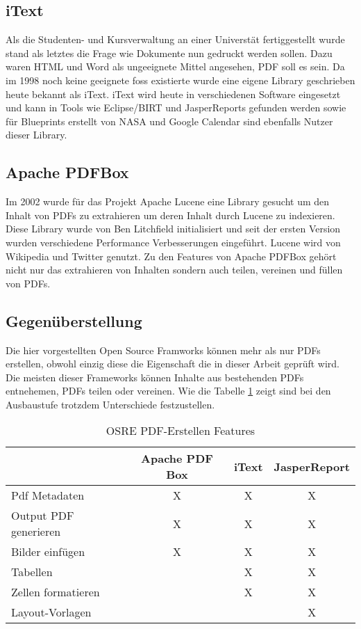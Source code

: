 \documentclass[main.tex]{subfiles}
\begin{document}
\subsection{iText}
Als die Studenten- und Kursverwaltung an einer Universtät fertiggestellt wurde stand als letztes die Frage wie Dokumente nun gedruckt werden sollen. Dazu waren HTML und Word als ungeeignete Mittel angesehen, PDF soll es sein. Da im 1998 noch keine geeignete \acrshort{foss} existierte wurde eine eigene Library geschrieben heute bekannt als iText. iText wird heute in verschiedenen Software eingesetzt und kann in Tools wie Eclipse/BIRT und JasperReports gefunden werden sowie für Blueprints erstellt von NASA und Google Calendar sind ebenfalls Nutzer dieser Library. \cite{lowagie_2010}

\subsection{Apache PDFBox}
Im 2002 wurde für das Projekt Apache Lucene eine Library gesucht um den Inhalt von PDFs zu extrahieren um deren Inhalt durch Lucene zu indexieren. Diese Library wurde von Ben Litchfield initialisiert und seit der ersten Version wurden verschiedene Performance Verbesserungen eingeführt. Lucene wird von Wikipedia und Twitter genutzt. Zu den Features von Apache PDFBox gehört nicht nur das extrahieren von Inhalten sondern auch teilen, vereinen und füllen von PDFs. 
\cite{apachepdfbox_history}


\subsection{Gegenüberstellung}

Die hier vorgestellten Open Source Framworks können mehr als nur PDFs erstellen, obwohl einzig diese die Eigenschaft die in dieser Arbeit geprüft wird. Die meisten dieser Frameworks können Inhalte aus bestehenden PDFs entnehemen, PDFs teilen oder vereinen. 
Wie die Tabelle \ref{table:featuresOSRE} zeigt sind bei den Ausbaustufe trotzdem Unterschiede festzustellen. 


\begin{table}[h]
\centering

\begin{tabular}{lccc}
               & Apache PDF Box & iText  & JasperReport \\ \hline
Pdf Metadaten           &         X      &   X    &     X        \\
Output PDF generieren   &         X      &   X    &     X        \\
Bilder einfügen         &  X             &   X    &     X        \\
Tabellen                &                &   X    &     X        \\
Zellen formatieren      &                &   X    &     X        \\
Layout-Vorlagen         &                &        &     X        \\
\end{tabular}
\caption{OSRE PDF-Erstellen Features}
\label{table:featuresOSRE}
\end{table}
\end{document}

